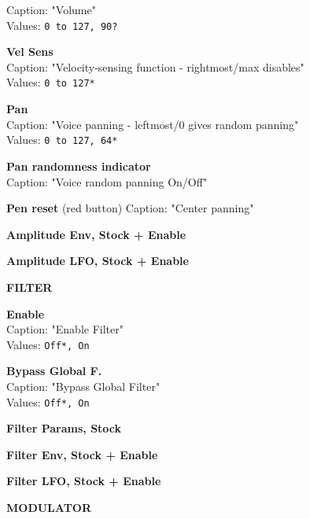 \documentclass[
 11pt,
 twoside,
 a4paper,
 headinclude,
 footinclude,
 final                                 %
]{article}
\begin{document}
\begin{enumber}
\begin{enumber}
\begin{enumber}
\begin{enumber}
\begin{enumber}
                     Caption: "Volume" \\
                     Values: \texttt{0 to 127, 90?}
                  \item \textbf{Vel Sens} \\
                     Caption: "Velocity-sensing function - rightmost/max
                        disables" \\
                     Values: \texttt{0 to 127*}
                  \item \textbf{Pan} \\
                     Caption: "Voice panning - leftmost/0 gives random
                        panning" \\
                     Values: \texttt{0 to 127, 64*}
                  \item \textbf{Pan randomness indicator} \\
                     Caption: "Voice random panning On/Off"
                  \item \textbf{Pen reset} (red button)
                     Caption: "Center panning" \\
                  \item \textbf{Amplitude Env, Stock + Enable}
                  \item \textbf{Amplitude LFO, Stock + Enable}
               \end{enumber}
               \item \textbf{FILTER}
               \begin{enumber}
                  \item \textbf{Enable} \\
                     Caption: "Enable Filter" \\
                     Values: \texttt{Off*, On}
                  \item \textbf{Bypass Global F.} \\
                     Caption: "Bypass Global Filter" \\
                     Values: \texttt{Off*, On}
                  \item \textbf{Filter Params, Stock}
                  \item \textbf{Filter Env, Stock + Enable}
                  \item \textbf{Filter LFO, Stock + Enable}
               \end{enumber}
               \item \textbf{MODULATOR}
               \begin{enumber}


\end{enumber}
\end{enumber}
\end{enumber}
\end{enumber}
\end{enumber}
\end{document}
